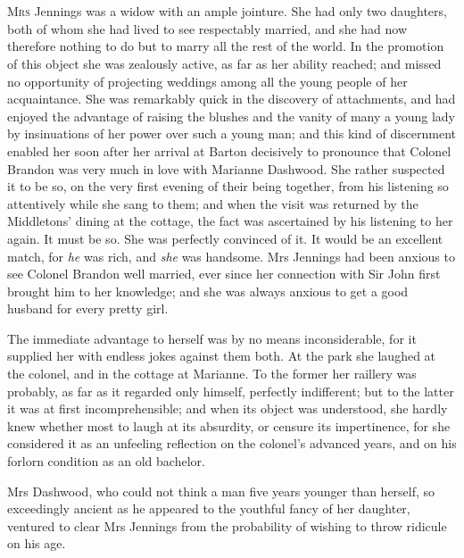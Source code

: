 \chapter[Chapter \thechapter]{}
\lettrine[lraise=0.3]{M}{rs} Jennings was a widow with an ample jointure. She had only two daughters, both of whom she had lived to see respectably married, and she had now therefore nothing to do but to marry all the rest of the world. In the promotion of this object she was zealously active, as far as her ability reached; and missed no opportunity of projecting weddings among all the young people of her acquaintance. She was remarkably quick in the discovery of attachments, and had enjoyed the advantage of raising the blushes and the vanity of many a young lady by insinuations of her power over such a young man; and this kind of discernment enabled her soon after her arrival at Barton decisively to pronounce that Colonel Brandon was very much in love with Marianne Dashwood. She rather suspected it to be so, on the very first evening of their being together, from his listening so attentively while she sang to them; and when the visit was returned by the Middletons' dining at the cottage, the fact was ascertained by his listening to her again. It must be so. She was perfectly convinced of it. It would be an excellent match, for \textit{he} was rich, and \textit{she} was handsome. Mrs Jennings had been anxious to see Colonel Brandon well married, ever since her connection with Sir John first brought him to her knowledge; and she was always anxious to get a good husband for every pretty girl.

The immediate advantage to herself was by no means inconsiderable, for it supplied her with endless jokes against them both. At the park she laughed at the colonel, and in the cottage at Marianne. To the former her raillery was probably, as far as it regarded only himself, perfectly indifferent; but to the latter it was at first incomprehensible; and when its object was understood, she hardly knew whether most to laugh at its absurdity, or censure its impertinence, for she considered it as an unfeeling reflection on the colonel's advanced years, and on his forlorn condition as an old bachelor.

Mrs Dashwood, who could not think a man five years younger than herself, so exceedingly ancient as he appeared to the youthful fancy of her daughter, ventured to clear Mrs Jennings from the probability of wishing to throw ridicule on his age.

